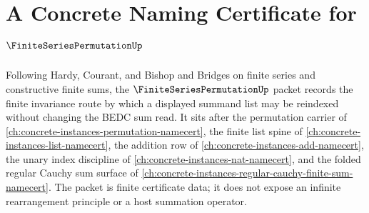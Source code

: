 \chapter{A Concrete Naming Certificate for $\FiniteSeriesPermutationUp$}
\label{ch:concrete-instances-finite-series-permutation-namecert}

Following Hardy, Courant, and Bishop and Bridges on finite series and constructive finite sums, the $\FiniteSeriesPermutationUp$ packet records the finite invariance route by which a displayed summand list may be reindexed without changing the BEDC sum read. It sits after the permutation carrier of \autoref{ch:concrete-instances-permutation-namecert}, the finite list spine of \autoref{ch:concrete-instances-list-namecert}, the addition row of \autoref{ch:concrete-instances-add-namecert}, the unary index discipline of \autoref{ch:concrete-instances-nat-namecert}, and the folded regular Cauchy sum surface of \autoref{ch:concrete-instances-regular-cauchy-finite-sum-namecert}. The packet is finite certificate data; it does not expose an infinite rearrangement principle or a host summation operator.


